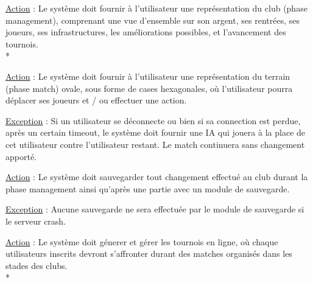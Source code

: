 \documentclass[a4paper]{article}
\begin{document}
\begin{description}[style=nextline]
			\item[Représenter phase management :]
			\begin{description}[leftmargin=*] %
				\item[]
				\item \underline{Action} : Le système doit fournir à l'utilisateur une représentation du \gls{club} (phase management), comprenant une vue d'ensemble sur son argent, ses rentrées, ses joueurs, ses infrastructures, les améliorations possibles, et l'avancement des tournois.\\*
			\end{description} %
			
			\item[Représenter phase match :]
			\begin{description}[leftmargin=*] %
				\item[]
				\item \underline{Action} : Le système doit fournir à l'utilisateur une représentation du terrain (phase match) ovale, sous forme de cases hexagonales, où l'utilisateur pourra déplacer ses joueurs et / ou effectuer une action.
				\item \underline{Exception} : Si un utilisateur se déconnecte ou bien si sa connection est perdue, après un certain timeout, le système doit fournir une IA qui jouera à la place de cet utilisateur contre l'utilisateur restant. Le match continuera sans changement apporté.
			\end{description} %
			
			\item[Sauvegarder :]
			\begin{description}[leftmargin=*] %
				\item[]
				\item \underline{Action} : Le système doit sauvegarder tout changement effectué au \gls{club} durant la phase management ainsi qu'après une partie avec un module de sauvegarde.
				\item \underline{Exception} : Aucune sauvegarde ne sera effectuée par le module de sauvegarde si le serveur crash.
			\end{description} %
			
			\item[Gérer les tournois :]
			\begin{description}[leftmargin=*] %
				\item[]
				\item \underline{Action} : Le système doit génerer et gérer les tournois en ligne, où chaque utilisateurs inscrits devront s'affronter durant des matches organisés dans les stades des clubs.\\*
			\end{description} %
			
		\end{description}
\end{document}
